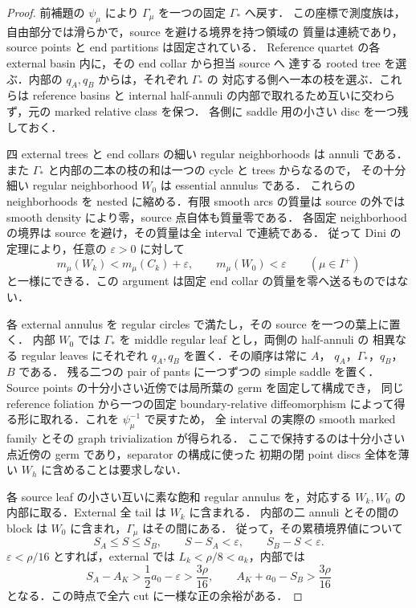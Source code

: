 \begin{proof}
前補題の $\psi_\mu$ により $\Gamma_\mu$ を一つの固定 $\Gamma_*$ へ戻す．
この座標で測度族は，自由部分では滑らかで，source を避ける境界を持つ領域の
質量は連続であり，source points と end partitions は固定されている．
Reference quartet の各 external basin 内に，その end collar から担当 source へ
達する rooted tree を選ぶ．内部の $q_A,q_B$ からは，それぞれ $\Gamma_*$ の
対応する側へ一本の枝を選ぶ．これらは reference basins と internal half-annuli
の内部で取れるため互いに交わらず，元の marked relative class を保つ．
各側に saddle 用の小さい disc を一つ残しておく．

四 external trees と end collars の細い regular neighborhoods は annuli である．
また $\Gamma_*$ と内部の二本の枝の和は一つの cycle と trees からなるので，
その十分細い regular neighborhood $W_0$ は essential annulus である．
これらの neighborhoods を nested に縮める．有限 smooth arcs の質量は
source の外では smooth density により零，source 点自体も質量零である．
各固定 neighborhood の境界は source を避け，その質量は全 interval で連続である．
従って Dini の定理により，任意の $\varepsilon>0$ に対して
\[
 m_\mu(W_k)<m_\mu(C_k)+\varepsilon,\qquad
 m_\mu(W_0)<\varepsilon\qquad(\mu\in I^+)
\]
と一様にできる．この argument は固定 end collar の質量を零へ送るものではない．

各 external annulus を regular circles で満たし，その source を一つの葉上に置く．
内部 $W_0$ では $\Gamma_*$ を middle regular leaf とし，両側の half-annuli の
相異なる regular leaves にそれぞれ $q_A,q_B$ を置く．その順序は常に $A$，
$q_A$，$\Gamma_*$，$q_B$，$B$ である．
残る二つの pair of pants に一つずつの simple saddle を置く．
Source points の十分小さい近傍では局所葉の germ を固定して構成でき，
同じ reference foliation から一つの固定 boundary-relative diffeomorphism
によって得る形に取れる．これを $\psi_\mu^{-1}$ で戻すため，
全 interval の実際の smooth marked family とその graph trivialization が得られる．
ここで保持するのは十分小さい点近傍の germ であり，separator の構成に使った
初期の閉 point discs 全体を薄い $W_h$ に含めることは要求しない．

各 source leaf の小さい互いに素な飽和 regular annulus を，対応する $W_k,W_0$
の内部に取る．External 全 tail は $W_k$ に含まれる．
内部の二 annuli とその間の block は $W_0$ に含まれ，$\Gamma_\mu$ はその間にある．
従って，その累積境界値について
\[
 S_A\le S\le S_B,\qquad
 S-S_A<\varepsilon,\qquad S_B-S<\varepsilon .
\]
$\varepsilon<\rho/16$ とすれば，external では
$L_k<\rho/8<a_k$，内部では
\[
 S_A-A_K>\frac12a_0-\varepsilon>\frac{3\rho}{16},\qquad
 A_K+a_0-S_B>\frac{3\rho}{16}
\]
となる．この時点で全六 cut に一様な正の余裕がある．


\end{proof}
